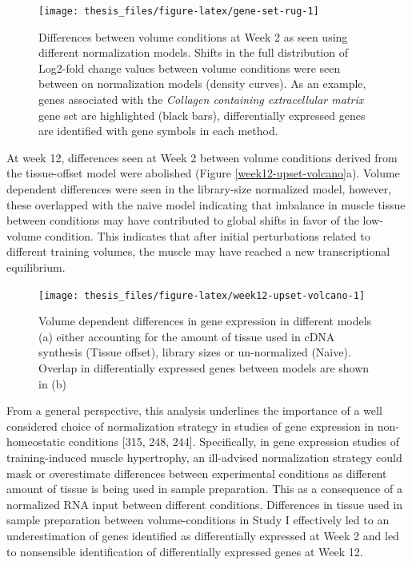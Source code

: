 \documentclass[twoside,10pt]{gihclass} %
\begin{document}
\begin{figure}

{\centering \texttt{[image: thesis\_files/figure-latex/gene-set-rug-1]} 

}

\caption[Global shifts in volume-dependent fold change as an effect of normalization methods at Week 2]{Differences between volume conditions at Week 2 as seen using different normalization models. Shifts in the full distribution of Log2-fold change values between volume conditions were seen between on normalization models (density curves). As an example, genes associated with the \textit{Collagen containing extracellular matrix} gene set are highlighted (black bars), differentially expressed genes are identified with gene symbols in each method.}\label{fig:gene-set-rug}
\end{figure}
At week 12, differences seen at Week 2 between volume conditions derived from the tissue-offset model were abolished (Figure \ref{week12-upset-volcano}a). Volume dependent differences were seen in the library-size normalized model, however, these overlapped with the naive model indicating that imbalance in muscle tissue between conditions may have contributed to global shifts in favor of the low-volume condition. This indicates that after initial perturbations related to different training volumes, the muscle may have reached a new transcriptional equilibrium.
\begin{figure}

{\centering \texttt{[image: thesis\_files/figure-latex/week12-upset-volcano-1]} 

}

\caption[General patterns of differentially expressed genes at Week 12]{Volume dependent differences in gene expression in different models (a) either accounting for the amount of tissue used in cDNA synthesis (Tissue offset), library sizes or un-normalized (Naive). Overlap in differentially expressed genes between models are shown in (b)}\label{fig:week12-upset-volcano}
\end{figure}
From a general perspective, this analysis underlines the importance of a well considered choice of normalization strategy in studies of gene expression in non-homeostatic conditions
{[}315, 248, 244{]}.
Specifically, in gene expression studies of training-induced muscle hypertrophy, an ill-advised normalization strategy could mask or overestimate differences between experimental conditions as different amount of tissue is being used in sample preparation. This as a consequence of a normalized RNA input between different conditions. Differences in tissue used in sample preparation between volume-conditions in Study I effectively led to an underestimation of genes identified as differentially expressed at Week 2 and led to nonsensible identification of differentially expressed genes at Week 12.
\end{document}
